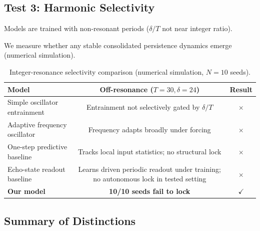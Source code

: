 \documentclass[12pt,a4paper]{article}
\begin{document}
\subsection{Test 3: Harmonic Selectivity}



Models are trained with non-resonant periods ($\delta/T$ not near integer ratio).

We measure whether any stable consolidated persistence dynamics emerge (numerical simulation).



\begin{table}[h]

\centering

\caption{Integer-resonance selectivity comparison (numerical simulation, $N=10$ seeds).}

\begin{tabular}{lcc}

\toprule

Model & Off-resonance ($T=30,\delta=24$) & Result \\

\midrule

Simple oscillator entrainment & Entrainment not selectively gated by $\delta/T$ & $\times$ \\

Adaptive frequency oscillator & Frequency adapts broadly under forcing & $\times$ \\

One-step predictive baseline & Tracks local input statistics; no structural lock & $\times$ \\

Echo-state readout baseline & Learns driven periodic readout under training; no autonomous lock in tested setting & $\times$ \\

\textbf{Our model} & \textbf{10/10 seeds fail to lock} & $\checkmark$ \\

\bottomrule

\end{tabular}

\label{tab:harmonic_sim}

\end{table}



\subsection{Summary of Distinctions}
\end{document}
